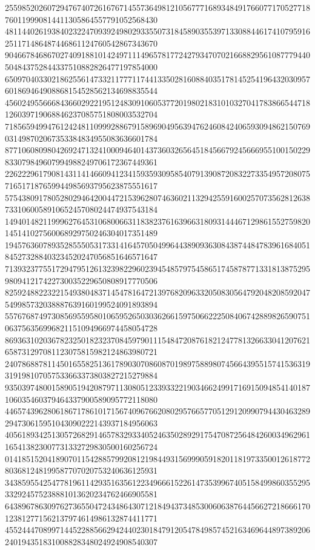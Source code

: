 \begin{DoxyCode}
      255985202607294767407261676714557364981210567771689348491766077170527718760119990814411305864557791052568430
      481144026193840232247093924980293355073184589035539713308844617410795916251171486487446861124760542867343670
      904667846867027409188101424971114965781772427934707021668829561087779440504843752844337510882826477197854000
      650970403302186255614733211777117441335028160884035178145254196432030957601869464908868154528562134698835544
      456024955666843660292219512483091060537720198021831010327041783866544718126039719068846237085751808003532704
      718565949947612424811099928867915896904956394762460842406593094862150769031498702067353384834955083636601784
      877106080980426924713241000946401437360326564518456679245666955100150229833079849607994988249706172367449361
      226222961790814311414660941234159359309585407913908720832273354957208075716517187659944985693795623875551617
      575438091780528029464200447215396280746360211329425591600257073562812638733106005891065245708024474937543184
      149401482119996276453106800663118382376163966318093144467129861552759820145141027560068929750246304017351489
      194576360789352855505317331416457050499644389093630843874484783961684051845273288403234520247056851646571647
      713932377551729479512613239822960239454857975458651745878771331813875295980941217422730035229650808917770506
      825924882232215493804837145478164721397682096332050830564792048208592047549985732038887639160199524091893894
      557676874973085695595801065952650303626615975066222508406742889826590751063756356996821151094966974458054728
      869363102036782325018232370845979011154847208761821247781326633041207621658731297081123075815982124863980721
      240786887811450165582513617890307086087019897588980745664395515741536319319198107057533663373803827215279884
      935039748001589051942087971130805123393322190346624991716915094854140187106035460379464337900589095772118080
      446574396280618671786101715674096766208029576657705129120990794430463289294730615951043090222143937184956063
      405618934251305726829146578329334052463502892917547087256484260034962961165413823007731332729830500160256724
      014185152041890701154288579920812198449315699905918201181973350012618772803681248199587707020753240636125931
      343859554254778196114293516356122349666152261473539967405158499860355295332924575238881013620234762466905581
      643896786309762736550472434864307121849437348530060638764456627218666170123812771562137974614986132874411771
      455244470899714452288566294244023018479120547849857452163469644897389206240194351831008828348024924908540307

\end{DoxyCode}
